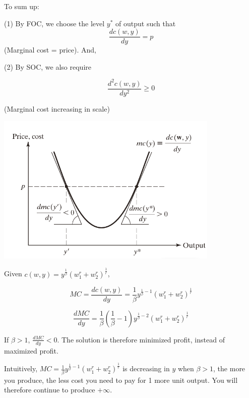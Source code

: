 \documentclass{article}
\begin{document}
\begin{mdframed}[backgroundcolor=blue!20,linecolor=white]
\vspace{3mm}

To sum up:


(1) By FOC, we choose the level $y^*$ of output such that 
$$\frac{dc(w,y)}{dy}= p$$
(Marginal cost = price). And,

(2) By SOC, we also require 

$$\frac{d^2c(w,y)}{dy^2} \ge 0$$

(Marginal cost increasing in scale)


\vspace{2mm}
{\centering
\includegraphics[width=0.8\textwidth]{5.mc}
\label{fig:mc}}
\vspace{2mm}

\end{mdframed}

Given $c(w,y) = y^{\frac{1}{\beta}}{(w_1^r + w_2^r)^{\frac{1}{r}}} $,

$$MC=\frac{dc(w,y)}{dy}= \frac{1}{\beta}  y^{\frac{1}{\beta} - 1}{(w_1^r + w_2^r)^{\frac{1}{r}}}$$

$$\frac{d MC}{dy} = \frac{1}{\beta}(\frac{1}{\beta} - 1)  y^{\frac{1}{\beta} - 2}{(w_1^r + w_2^r)^{\frac{1}{r}}}$$


If $\beta >1$, $\frac{d MC}{dy} < 0$. The solution is therefore minimized profit, instead of maximized profit.

\begin{mdframed}[backgroundcolor=blue!20,linecolor=white]
Intuitively, $MC=\frac{1}{\beta}  y^{\frac{1}{\beta} - 1}{(w_1^r + w_2^r)^{\frac{1}{r}}}$ is decreasing in $y$ when $\beta > 1$, the more you produce, the less cost you need to pay for 1 more unit output. You will therefore continue to produce $+\infty$.

\end{mdframed}
\end{document}
